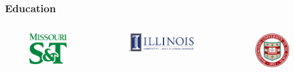 \begin{frame}
	\frametitle{Education}
	\begin{columns}
		\column[t]{5cm}
		\begin{figure}
			\includegraphics[width=0.7\linewidth]{mst}
		\end{figure}
		\begin{figure}
		\includegraphics[width=\linewidth]{uiuc}
		\end{figure}
		\column[t]{6cm}
		\begin{figure}
		\includegraphics[width=0.7\linewidth]{wustl}
		\end{figure}
	\end{columns}
\end{frame}

